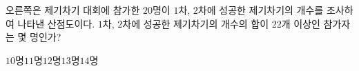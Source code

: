 \noindent\begin{minipage}[t]{0.58\linewidth}\vspace{0pt}\raggedright 오른쪽은 제기차기 대회에 참가한 $20$명이 $1$차, $2$차에 성공한 제기차기의 개수를 조사하여 나타낸 산점도이다. $1$차, $2$차에 성공한 제기차기의 개수의 합이 $22$개 이상인 참가자는 몇 명인가?\end{minipage}\hfill\begin{minipage}[t]{0.4\linewidth}\vspace{0pt}\centering \resizebox{\ifdim\width>\linewidth\linewidth\else\width\fi}{!}{}\end{minipage}\par
\begin{choices32}{$10$명}{$11$명}{$12$명}{$13$명}{$14$명}\end{choices32}
